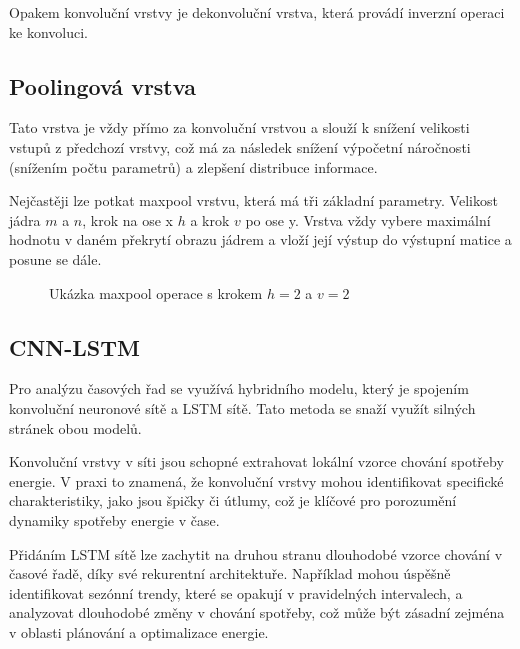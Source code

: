 \documentclass[FM,BP,fonts]{tulthesis}
\begin{document}
Opakem konvoluční vrstvy je dekonvoluční vrstva, která provádí inverzní operaci ke konvoluci. 

\subsection{Poolingová vrstva}
Tato vrstva je vždy přímo za konvoluční vrstvou a slouží k snížení velikosti vstupů z předchozí vrstvy, což má za následek snížení výpočetní náročnosti (snížením počtu parametrů) a zlepšení distribuce informace.

Nejčastěji lze potkat maxpool vrstvu, která má tři základní parametry. Velikost jádra $m$ a $n$, krok na ose x $h$ a krok $v$ po ose y. Vrstva vždy vybere maximální hodnotu v daném překrytí obrazu jádrem a vloží její výstup do výstupní matice a posune se dále.

\begin{figure}[htbp]
	\centering
	\caption{Ukázka maxpool operace s krokem $h=2$ a $v=2$ }
	\label{fig:nezamestnanost}
\end{figure}

\subsection{CNN-LSTM}\label{cnn-lstm-teorie}
Pro analýzu časových řad se využívá hybridního modelu, který je spojením konvoluční neuronové sítě a LSTM sítě. Tato metoda se snaží využít silných stránek obou modelů. 

Konvoluční vrstvy v síti jsou schopné extrahovat lokální vzorce chování spotřeby energie. V praxi to znamená, že konvoluční vrstvy mohou identifikovat specifické charakteristiky, jako jsou špičky či útlumy, což je klíčové pro porozumění dynamiky spotřeby energie v čase. 

Přidáním LSTM sítě lze zachytit na druhou stranu dlouhodobé vzorce chování v časové řadě, díky své rekurentní architektuře.
 Například mohou úspěšně identifikovat sezónní trendy, které se opakují v pravidelných intervalech, a analyzovat dlouhodobé změny v chování spotřeby, což může být zásadní zejména v oblasti plánování a optimalizace energie. 
\end{document}
